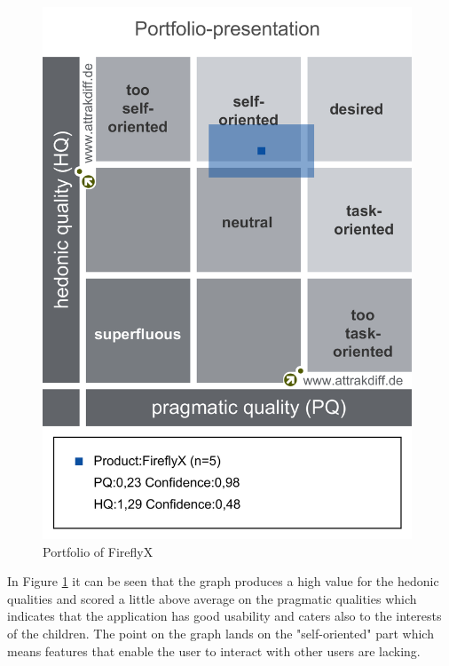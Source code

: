 \begin{figure}[H]
    \centering
    \includegraphics[width=11cm]{figures/NewFigures/Portfolio_of_results.png}
    \caption{Portfolio of FireflyX}
    \label{fig:PortfolioOfFireflyX}
\end{figure}

In Figure \ref{fig:PortfolioOfFireflyX} it can be seen that the graph produces a high value for the hedonic qualities and scored a little above average on the pragmatic qualities which indicates that the application has good usability and caters also to the interests of the children. The point on the graph lands on the "self-oriented" part which means features that enable the user to interact with other users are lacking.

